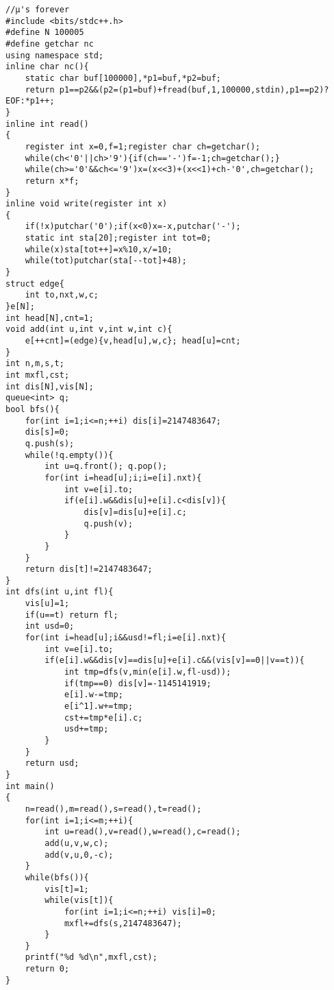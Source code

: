 \begin{verbatim}
//μ's forever
#include <bits/stdc++.h>
#define N 100005
#define getchar nc
using namespace std;
inline char nc(){
    static char buf[100000],*p1=buf,*p2=buf;
    return p1==p2&&(p2=(p1=buf)+fread(buf,1,100000,stdin),p1==p2)?EOF:*p1++;
}
inline int read()
{
    register int x=0,f=1;register char ch=getchar();
    while(ch<'0'||ch>'9'){if(ch=='-')f=-1;ch=getchar();}
    while(ch>='0'&&ch<='9')x=(x<<3)+(x<<1)+ch-'0',ch=getchar();
    return x*f;
}
inline void write(register int x)
{
    if(!x)putchar('0');if(x<0)x=-x,putchar('-');
    static int sta[20];register int tot=0;
    while(x)sta[tot++]=x%10,x/=10;
    while(tot)putchar(sta[--tot]+48);
}
struct edge{
    int to,nxt,w,c;
}e[N];
int head[N],cnt=1;
void add(int u,int v,int w,int c){
    e[++cnt]=(edge){v,head[u],w,c}; head[u]=cnt;
}
int n,m,s,t;
int mxfl,cst;
int dis[N],vis[N];
queue<int> q;
bool bfs(){
    for(int i=1;i<=n;++i) dis[i]=2147483647;
    dis[s]=0;
    q.push(s);
    while(!q.empty()){
        int u=q.front(); q.pop();
        for(int i=head[u];i;i=e[i].nxt){
            int v=e[i].to;
            if(e[i].w&&dis[u]+e[i].c<dis[v]){
                dis[v]=dis[u]+e[i].c;
                q.push(v);
            }
        }
    }
    return dis[t]!=2147483647;
}
int dfs(int u,int fl){
    vis[u]=1;
    if(u==t) return fl;
    int usd=0;
    for(int i=head[u];i&&usd!=fl;i=e[i].nxt){
        int v=e[i].to;
        if(e[i].w&&dis[v]==dis[u]+e[i].c&&(vis[v]==0||v==t)){
            int tmp=dfs(v,min(e[i].w,fl-usd));
            if(tmp==0) dis[v]=-1145141919;
            e[i].w-=tmp;
            e[i^1].w+=tmp;
            cst+=tmp*e[i].c;
            usd+=tmp;
        }
    }
    return usd;
}
int main()
{
    n=read(),m=read(),s=read(),t=read();
    for(int i=1;i<=m;++i){
        int u=read(),v=read(),w=read(),c=read();
        add(u,v,w,c);
        add(v,u,0,-c);
    }
    while(bfs()){
        vis[t]=1;
        while(vis[t]){
            for(int i=1;i<=n;++i) vis[i]=0;
            mxfl+=dfs(s,2147483647);
        }
    }
    printf("%d %d\n",mxfl,cst);
    return 0;
}

\end{verbatim}
